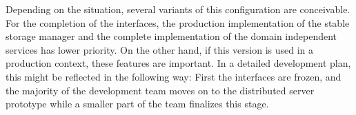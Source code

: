 \documentclass[a4paper, 10pt]{book}
\begin{document}
                                        Depending on the situation, several variants of this configuration are
                                        conceivable.
                                        For the completion of the interfaces, the production implementation of
                                        the stable storage manager and the complete implementation of the
                                        domain independent services has lower priority. On the other hand, if
                                        this version is used in a production context, these features are
                                        important. In a detailed development plan, this might be reflected in
                                        the following way: First the interfaces are frozen, and the majority
                                        of the development team moves on to the distributed server prototype
                                        while a smaller part of the team finalizes this stage.


\end{document}
